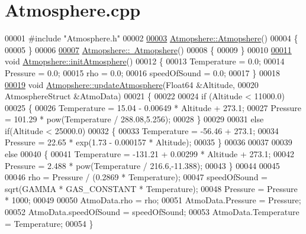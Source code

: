 \hypertarget{_atmosphere_8cpp_source}{}\section{Atmosphere.\+cpp}
\label{_atmosphere_8cpp_source}

\begin{DoxyCode}
00001 \textcolor{preprocessor}{#include "Atmosphere.h"}
00002 
\hyperlink{group___atmosphere_a77ca553d3c4e855dd921a451d65cc313}{00003} \hyperlink{group___atmosphere_a77ca553d3c4e855dd921a451d65cc313}{Atmopshere::Atmopshere}()
00004 \{
00005 \}
00006 
\hyperlink{group___atmosphere_ac7815ca8008ed54dc758f2bf7a6104f7}{00007} \hyperlink{group___atmosphere_ac7815ca8008ed54dc758f2bf7a6104f7}{Atmopshere::~Atmopshere}()
00008 \{
00009 \}
00010 
\hyperlink{group___atmosphere_a6e1d5763fbb6631784c99ee3c88911bd}{00011} \textcolor{keywordtype}{void} \hyperlink{group___atmosphere_a6e1d5763fbb6631784c99ee3c88911bd}{Atmopshere::initAtmosphere}()
00012 \{
00013     Temperature     = 0.0;  
00014     Pressure        = 0.0;       
00015     rho             = 0.0;          
00016     speedOfSound    = 0.0;   
00017 \}
00018 
\hyperlink{group___atmosphere_a2bd97471d32725d6196ee6816ea36c99}{00019} \textcolor{keywordtype}{void} \hyperlink{group___atmosphere_a2bd97471d32725d6196ee6816ea36c99}{Atmopshere::updateAtmosphere}(Float64 &Altitude, 
00020                                   AtmosphereStruct &AtmoData)
00021 \{
00022 
00024     \textcolor{keywordflow}{if} (Altitude < 11000.0)
00025     \{
00026         Temperature = 15.04 - 0.00649 * Altitude + 273.1;
00027         Pressure = 101.29 * pow(Temperature / 288.08,5.256);
00028     \}
00029 
00031     \textcolor{keywordflow}{else} \textcolor{keywordflow}{if}(Altitude < 25000.0)
00032     \{
00033                 Temperature = -56.46 + 273.1;
00034                 Pressure = 22.65 * exp(1.73 - 0.000157 * Altitude);
00035     \}
00036 
00037 
00039     \textcolor{keywordflow}{else}
00040     \{ 
00041             Temperature = -131.21 + 0.00299 * Altitude + 273.1;
00042             Pressure = 2.488 * pow(Temperature / 216.6,-11.388);
00043     \}
00044         
00045 
00046             rho          = Pressure / (0.2869 * Temperature);           
00047             speedOfSound = sqrt(GAMMA * GAS\_CONSTANT * Temperature);
00048             Pressure     = Pressure * 1000;
00049 
00050             AtmoData.rho = rho;
00051             AtmoData.Pressure = Pressure;
00052             AtmoData.speedOfSound = speedOfSound;
00053             AtmoData.Temperature = Temperature;
00054 \}
\end{DoxyCode}
